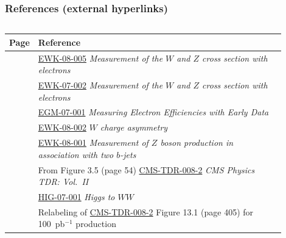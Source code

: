 \documentclass[compress]{beamer}
\begin{document}

\scriptsize

\begin{frame}
\frametitle{References (external hyperlinks)}

\vfill
\begin{columns}
\renewcommand{\arraystretch}{1.04}
\begin{tabular}{c p{0.9\linewidth}}
Page & Reference \\\hline\hline
\pageref{rediscovering_standard_model} & \textcolor{blue}{\href{http://cms-physics.web.cern.ch/cms-physics/public/EWK-08-005-pas.pdf}{EWK-08-005}} {\it Measurement of the $W$ and $Z$ cross section with electrons} \\
 & \textcolor{blue}{\href{http://cms-physics.web.cern.ch/cms-physics/public/EWK-07-002-pas.pdf}{EWK-07-002}} {\it Measurement of the $W$ and $Z$ cross section with electrons} \\
\pageref{using_standard_model_for_future} & \textcolor{blue}{\href{http://cms-physics.web.cern.ch/cms-physics/public/EGM-07-001-pas.pdf}{EGM-07-001}} {\it Measuring Electron Efficiencies with Early Data} \\
 & \textcolor{blue}{\href{http://cms-physics.web.cern.ch/cms-physics/public/EWK-08-002-pas.pdf}{EWK-08-002}} {\it $W$ charge asymmetry} \\
\pageref{discoveries_in_standard_model} & \textcolor{blue}{\href{http://cms-physics.web.cern.ch/cms-physics/public/EWK-08-001-pas.pdf}{EWK-08-001}} {\it Measurement of $Z$ boson production in association with two $b$-jets} \\
 & From Figure 3.5 (page 54) \textcolor{blue}{\href{http://cdsweb.cern.ch/record/942733}{CMS-TDR-008-2}} {\it CMS Physics TDR: Vol.\ II} \\
 & \textcolor{blue}{\href{http://cms-physics.web.cern.ch/cms-physics/public/HIG-07-001-pas.pdf}{HIG-07-001}} {\it Higgs to $WW$} \\
\pageref{susy_at_100ipb} & Relabeling of \textcolor{blue}{\href{http://cdsweb.cern.ch/record/942733}{CMS-TDR-008-2}} Figure 13.1 (page 405) for 100~pb$^{-1}$ production \\

\end{tabular}
\end{columns}
\end{frame}
\end{document}
